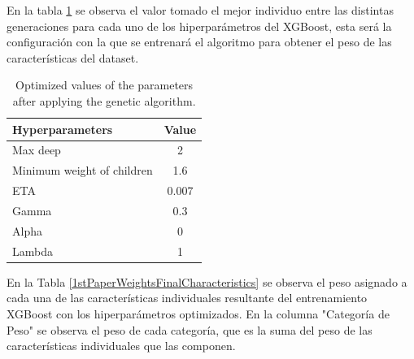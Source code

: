 \documentclass{uathesis-es}
\begin{document}
{	
	En la tabla \ref{BestGASolutionTable} se observa el valor tomado el mejor individuo entre las distintas generaciones para cada uno de los hiperparámetros del XGBoost, esta será la configuración con la que se entrenará el algoritmo para obtener el peso de las características del dataset.
	
	\begin{table}[h]
		\centering
		\begin{tabular}{ |l|c| } 
			\hline
			\textbf{Hyperparameters} & \textbf{Value}\\
			\hline
			Max deep & 2 \\
			Minimum weight of children & 1.6 \\ 
			ETA & 0.007 \\
			Gamma & 0.3 \\
			Alpha & 0 \\
			Lambda & 1 \\
			\hline
		\end{tabular}
		\caption{Optimized values of the parameters after applying the genetic algorithm.}
		\label{BestGASolutionTable}
	\end{table}
	
	
	En la Tabla \ref{1stPaperWeightsFinalCharacteristics} se observa el peso asignado a cada una de las características individuales resultante del entrenamiento XGBoost con los hiperparámetros optimizados. En la columna "Categoría de Peso" se observa el peso de cada categoría, que es la suma del peso de las características individuales que las componen.
	
}
\end{document}
